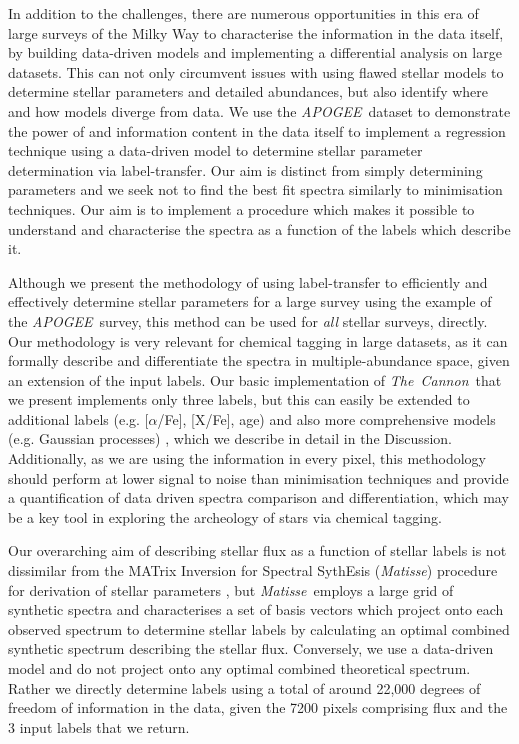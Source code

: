 \documentclass[12pt, preprint]{aastex}
\newcommand{\tc}{\textsl{The~Cannon}}
\newcommand{\apogee}{\textsl{APOGEE}}
\newcommand{\matisse}{\textsl{Matisse}}
\begin{document}
In addition to the challenges, there are numerous opportunities in this era of large surveys of the Milky Way to characterise the information in the data itself, by building data-driven models and implementing a differential analysis on large datasets. This can not only circumvent issues with using flawed stellar models to determine stellar parameters and detailed abundances, but also identify where and how models diverge from data. We use the \apogee\ dataset to demonstrate the power of and information content in the data itself to implement a regression technique using a data-driven model to determine stellar parameter determination via label-transfer. Our aim is distinct from simply determining parameters and we seek not to find the best fit spectra similarly to minimisation techniques. Our aim is to implement a procedure which makes it possible to understand and characterise the spectra as a function of the labels which describe it. 

Although we present the methodology of using label-transfer to efficiently and effectively determine stellar parameters for a large survey using the example of the \apogee\ survey, this method can be used for \textit{all} stellar surveys, directly.  Our methodology is very relevant for chemical tagging in large datasets, as it can formally describe and differentiate the spectra in multiple-abundance space, given an extension of the input labels.  Our basic implementation of \tc\ that we present implements only three labels, but this can easily be extended to additional labels  (e.g. [$\alpha$/Fe], [X/Fe], age) and also more comprehensive models (e.g. Gaussian processes) , which we describe in detail in the Discussion. Additionally, as we are using the information in every pixel, this methodology should perform at lower signal to noise than minimisation techniques and provide a quantification of data driven spectra comparison and differentiation, which may be a key tool in exploring the archeology of stars via chemical tagging. 

Our overarching aim of describing stellar flux as a function of stellar labels is not dissimilar from the MATrix Inversion for Spectral SythEsis (\matisse) procedure for derivation of stellar parameters \citep{Reico-Blanco2006}, but \matisse\ employs a large grid of synthetic spectra and characterises a set of basis vectors which project onto each observed spectrum to determine stellar labels by calculating an optimal combined synthetic spectrum describing the stellar flux. Conversely, we use a data-driven model and do not project onto any optimal combined theoretical spectrum. Rather we directly determine labels using a total of around 22,000 degrees of freedom of information in the data, given the 7200 pixels comprising flux and the 3 input labels that we return. %
\end{document}
